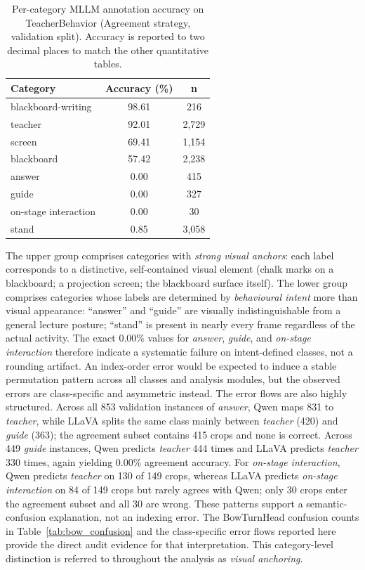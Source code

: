 \documentclass{ieeeaccess}
\begin{document}
\begin{table}[!ht]
\caption{Per-category MLLM annotation accuracy on TeacherBehavior
(Agreement strategy, validation split). Accuracy is reported to two
decimal places to match the other quantitative tables.}
\label{tab:per_class}
\centering
\begin{tabular}{lcc}
\toprule
\textbf{Category} & \textbf{Accuracy (\%)} & \textbf{n} \\
\midrule
blackboard-writing  & 98.61 & 216  \\
teacher             & 92.01 & 2{,}729 \\
screen              & 69.41 & 1{,}154 \\
blackboard          & 57.42 & 2{,}238 \\
\midrule
answer              &  0.00 & 415  \\
guide               &  0.00 & 327  \\
on-stage interaction &  0.00 & 30   \\
stand               &  0.85 & 3{,}058 \\
\bottomrule
\end{tabular}
\end{table}

The upper group comprises categories with \emph{strong visual
anchors}: each label corresponds to a distinctive, self-contained
visual element (chalk marks on a blackboard; a projection screen; the
blackboard surface itself).
The lower group comprises categories whose labels are determined by
\emph{behavioural intent} more than visual appearance: ``answer''
and ``guide'' are visually indistinguishable from a general lecture
posture; ``stand'' is present in nearly every frame regardless of the
actual activity.
The exact 0.00\% values for \textit{answer}, \textit{guide}, and
\textit{on-stage interaction} therefore indicate a systematic failure
on intent-defined classes, not a rounding artifact.
An index-order error would be expected to induce a stable permutation
pattern across all classes and analysis modules, but the observed errors
are class-specific and asymmetric instead.
The error flows are also highly structured. Across all 853 validation
instances of \textit{answer}, Qwen maps 831 to \textit{teacher}, while
LLaVA splits the same class mainly between \textit{teacher} (420) and
\textit{guide} (363); the agreement subset contains 415 crops and none
is correct. Across 449 \textit{guide} instances, Qwen predicts
\textit{teacher} 444 times and LLaVA predicts \textit{teacher} 330
times, again yielding 0.00\% agreement accuracy. For
\textit{on-stage interaction}, Qwen predicts \textit{teacher} on 130 of
149 crops, whereas LLaVA predicts \textit{on-stage interaction} on 84
of 149 crops but rarely agrees with Qwen; only 30 crops enter the
agreement subset and all 30 are wrong. These patterns support a
semantic-confusion explanation, not an indexing error. The
BowTurnHead confusion counts in Table~\ref{tab:bow_confusion} and the
class-specific error flows reported here provide the direct audit
evidence for that interpretation.
This category-level distinction is referred to throughout the analysis
as \emph{visual anchoring}.
\end{document}
